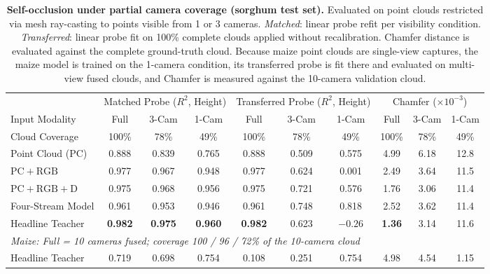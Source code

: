 \documentclass[10pt,twocolumn,letterpaper]{article}
\begin{document}
\begin{table}[t]
  \caption{\textbf{Self-occlusion under partial camera coverage (sorghum test set).} Evaluated on point clouds restricted via mesh ray-casting to points visible from 1 or 3 cameras. \emph{Matched}: linear probe refit per visibility condition. \emph{Transferred}: linear probe fit on 100\% complete clouds applied without recalibration. Chamfer distance is evaluated against the complete ground-truth cloud. Because maize point clouds are single-view captures, the maize model is trained on the 1-camera condition, its transferred probe is fit there and evaluated on multi-view fused clouds, and Chamfer is measured against the 10-camera validation cloud.}
  \label{tab:views}
  \centering\scriptsize
  \setlength{\tabcolsep}{3.4pt}
  \begin{tabular}{l ccc ccc ccc}
    \toprule
    & \multicolumn{3}{c}{Matched Probe ($R^2$, Height)} & \multicolumn{3}{c}{Transferred Probe ($R^2$, Height)} & \multicolumn{3}{c}{Chamfer ($\times10^{-3}$)} \\
    \cmidrule(lr){2-4}\cmidrule(lr){5-7}\cmidrule(lr){8-10}
    Input Modality & Full & 3-Cam & 1-Cam & Full & 3-Cam & 1-Cam & Full & 3-Cam & 1-Cam \\
    Cloud Coverage & 100\% & 78\% & 49\% & 100\% & 78\% & 49\% & 100\% & 78\% & 49\% \\
    \midrule
    Point Cloud (PC) & 0.888 & 0.839 & 0.765 & 0.888 & 0.509 & 0.575 & 4.99 & 6.18 & 12.8 \\
    $\mathrm{PC}+\mathrm{RGB}$ & 0.977 & 0.967 & 0.948 & 0.977 & 0.624 & 0.001 & 2.49 & 3.64 & 11.5 \\
    $\mathrm{PC}+\mathrm{RGB}+\mathrm{D}$ & 0.975 & 0.968 & 0.956 & 0.975 & 0.721 & 0.576 & 1.76 & 3.06 & 11.4 \\
    Four-Stream Model & 0.961 & 0.953 & 0.946 & 0.961 & 0.748 & 0.818 & 2.52 & 3.62 & 11.4 \\
    Headline Teacher & \textbf{0.982} & \textbf{0.975} & \textbf{0.960} & \textbf{0.982} & 0.623 & $-0.26$ & \textbf{1.36} & 3.14 & 11.6 \\
    \midrule
    \multicolumn{10}{l}{\emph{Maize: Full = 10 cameras fused; coverage 100 / 96 / 72\% of the 10-camera cloud}} \\
    Headline Teacher & 0.719 & 0.698 & 0.754 & 0.108 & 0.251 & 0.754 & 4.98 & 4.54 & 1.15 \\
    \bottomrule
  \end{tabular}
\end{table}
\end{document}
